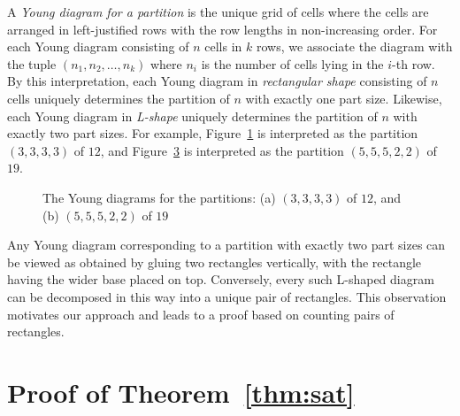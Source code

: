 \documentclass[a4paper,oneside,reqno]{amsart}
\theoremstyle{plain}
\theoremstyle{definition}
\theoremstyle{remark}
\begin{document}
	
	A {\em Young diagram for a partition} is the unique grid of cells where the cells are arranged in left-justified rows with the row lengths in non-increasing order. For each Young diagram consisting of $n$ cells in $k$ rows, we associate the diagram with the tuple $(n_1,n_2,\hdots, n_k)$ where $n_i$ is the number of cells lying in the $i$-th row. By this interpretation, each Young diagram in {\em rectangular shape} consisting of $n$ cells uniquely determines the partition of $n$ with exactly one part size. Likewise, each Young diagram in {\em L-shape} uniquely determines the partition of $n$ with exactly two part sizes. For example, Figure~\ref{young12}
is interpreted as the partition $(3,3,3,3)$ of $12$, and 
	Figure~\ref{young19} is interpreted as the partition $(5,5,5,2,2)$ of $19$.
	
	\begin{figure}
		\centering
		\begin{subfigure}{.45\linewidth}
			\centering
			\scriptsize{}
			\caption{}
			\label{young12}
		\end{subfigure}
		\begin{subfigure}{.45\linewidth}
			\centering
			\scriptsize{}
			\caption{}
			\label{young19}
		\end{subfigure}
		
		\caption{The Young diagrams for the partitions: (a) $(3,3,3,3)$ of $12$, and (b) $(5,5,5,2,2)$ of $19$}
	\end{figure}

    
   Any Young diagram corresponding to a partition with exactly two part sizes can be viewed as obtained by gluing two rectangles vertically, with the rectangle having the wider base placed on top. Conversely, every such L-shaped diagram can be decomposed in this way into a unique pair of rectangles. This observation motivates our approach and leads to a proof based on counting pairs of rectangles.

	\section{Proof of Theorem~\ref{thm:sat}}
	\label{sec:thm:sat}
    
\end{document}
